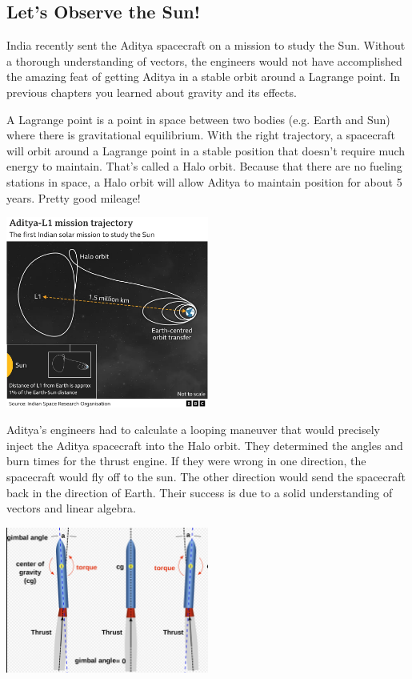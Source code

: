 \subsection{Let's Observe the Sun!}
India recently sent the Aditya spacecraft on a mission to study the Sun. Without a thorough understanding of vectors, the engineers would not have accomplished the amazing feat of getting Aditya in a stable orbit around a Lagrange point. In previous chapters you learned about gravity and its effects. 

A Lagrange point is a point in space between two bodies (e.g. Earth and Sun) where there is gravitational equilibrium. With the right trajectory, a spacecraft will orbit around a Lagrange point in a stable position that doesn’t require much energy to maintain. That’s called a Halo orbit. Because that there are no fueling stations in space, a Halo orbit will allow Aditya to maintain position for about 5 years. Pretty good mileage!

\includegraphics[width=0.5\textwidth]{orbit.png}

Aditya’s engineers had to calculate a looping maneuver that would precisely inject the Aditya spacecraft into the Halo orbit. They determined the angles and burn times for the thrust engine. If they were wrong in one direction, the spacecraft would fly off to the sun. The other direction would send the spacecraft back in the direction of Earth. Their success is due to a solid understanding of vectors and linear algebra.

\includegraphics[width=0.5\textwidth]{thrust.png}

